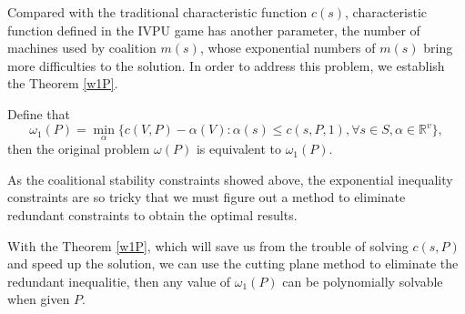 Compared with the traditional characteristic function $c(s)$, characteristic function defined in the IVPU game has another parameter, the number of machines used by coalition $m(s)$, whose exponential numbers of $m(s)$ bring more difficulties to the solution.
In order to address this problem, we establish the Theorem \ref{w1P}.

\begin{thm}\label{w1P}
  Define that
  \[
    {\omega_1(P)}=\mathop{\min}_{\alpha}\{c(V,P)-\alpha(V): \alpha(s)\leq c(s,P,1), \forall s \in S, \alpha\in\mathbb{R}^{v}\},
  \]
then the original problem $\omega(P)$ is equivalent to $\omega_1(P)$.
\end{thm}

As the coalitional stability constraints showed above, the exponential inequality constraints are so tricky that we must figure out a method to eliminate redundant constraints to obtain the optimal results.

With the Theorem \ref{w1P}, which will save us from the trouble of solving $c(s, P)$ and speed up the solution, we can use the cutting plane method to eliminate the redundant inequalitie, then  any value of $\omega_1(P)$ can be polynomially solvable when given $P$.
